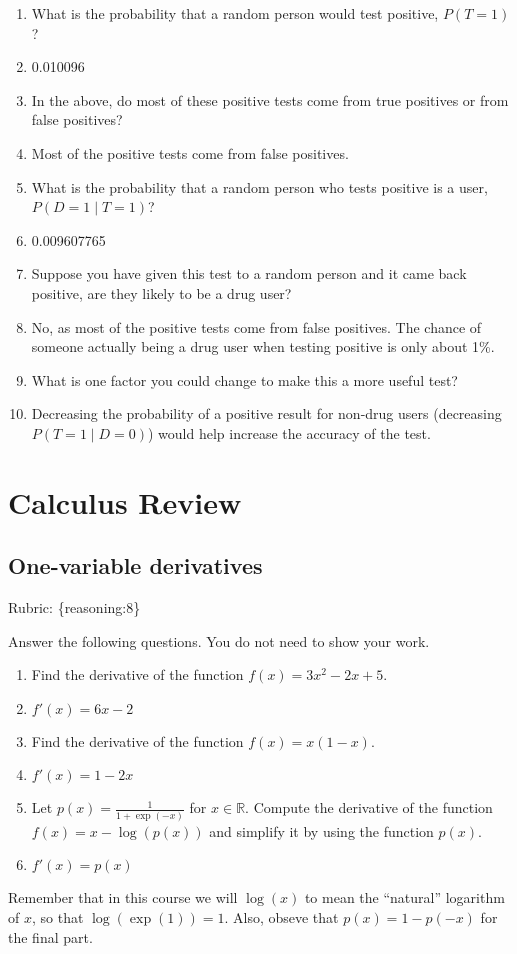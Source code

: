 \documentclass{article}
\def\rubric#1{\gre{Rubric: \{#1\}}}{}
\def\blu#1{{\color{blu}#1}}
\def\gre#1{{\color{gre}#1}}
\def\R{\mathbb{R}}
\begin{document}
\begin{enumerate}
\item What is the probability that a random person would test positive, $P(T=1)$?
\item[] \gre{0.010096}
\item In the above, do most of these positive tests come from true positives or from false positives?
\item[] \gre{Most of the positive tests come from false positives.}
\item What is the probability that a random person who tests positive is a user, $P(D=1 \mid T=1)$?
\item[] \gre{0.009607765}
\item Suppose you have given this test to a random person and it came back positive, are they likely to be a drug user?
\item[] \gre{No, as most of the positive tests come from false positives. The chance of someone actually being a drug user when testing positive is only about 1\%.}
\item What is one factor you could change to make this a more useful test?
\item[] \gre{Decreasing the probability of a positive result for non-drug users (decreasing $P(T=1 \mid D=0)$) would help increase the accuracy of the test.}
\end{enumerate}

\section{Calculus Review}

\subsection{One-variable derivatives}
\label{sub.one.var}
\rubric{reasoning:8}

\blu{Answer the following questions.} You do not need to show your work.

\begin{enumerate}
\item Find the derivative of the function $f(x) = 3x^2 -2x + 5$.
\item[] \gre{$f'(x) = 6x - 2$}
\item Find the derivative of the function $f(x) = x(1-x)$.
\item[] \gre{$f'(x) = 1 - 2x$}
\item Let $p(x) = \frac{1}{1+\exp(-x)}$ for $x \in \R$. Compute the derivative of the function $f(x) = x-\log(p(x))$ and simplify it by using the function $p(x)$.
\item[] \gre{$f'(x) = p(x)$}
\end{enumerate}
Remember that in this course we will $\log(x)$ to mean the ``natural'' logarithm of $x$, so that $\log(\exp(1)) = 1$. Also, obseve that $p(x) = 1-p(-x)$ for the final part.
\end{document}

